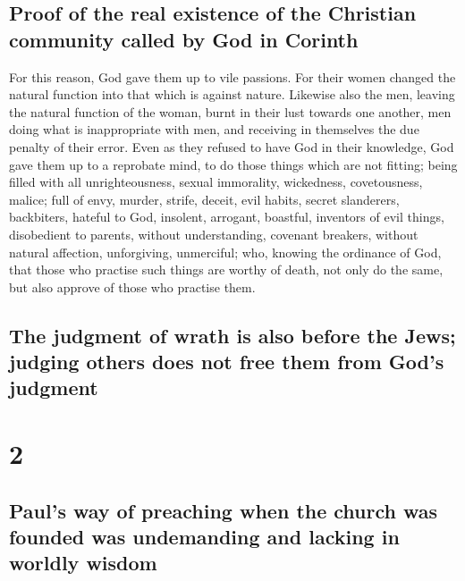 \hypertarget{proof-of-the-real-existence-of-the-christian-community-called-by-god-in-corinth}{%
\subsection{Proof of the real existence of the Christian community
called by God in
Corinth}\label{proof-of-the-real-existence-of-the-christian-community-called-by-god-in-corinth}}

 For this reason, God gave them up to vile passions. For
their women changed the natural function into that which is against
nature.  Likewise also the men, leaving the natural
function of the woman, burnt in their lust towards one another, men
doing what is inappropriate with men, and receiving in themselves the
due penalty of their error.  Even as they refused to have
God in their knowledge, God gave them up to a reprobate mind, to do
those things which are not fitting;  being filled with
all unrighteousness, sexual immorality, wickedness, covetousness,
malice; full of envy, murder, strife, deceit, evil habits, secret
slanderers,  backbiters, hateful to God, insolent,
arrogant, boastful, inventors of evil things, disobedient to parents,
 without understanding, covenant breakers, without
natural affection, unforgiving, unmerciful;  who, knowing
the ordinance of God, that those who practise such things are worthy of
death, not only do the same, but also approve of those who practise
them.

\hypertarget{the-judgment-of-wrath-is-also-before-the-jews-judging-others-does-not-free-them-from-gods-judgment}{%
\subsection{The judgment of wrath is also before the Jews; judging
others does not free them from God's
judgment}\label{the-judgment-of-wrath-is-also-before-the-jews-judging-others-does-not-free-them-from-gods-judgment}}

\hypertarget{section-1}{%
\section{2}\label{section-1}}

\hypertarget{pauls-way-of-preaching-when-the-church-was-founded-was-undemanding-and-lacking-in-worldly-wisdom}{%
\subsection{Paul's way of preaching when the church was founded was
undemanding and lacking in worldly
wisdom}\label{pauls-way-of-preaching-when-the-church-was-founded-was-undemanding-and-lacking-in-worldly-wisdom}}

